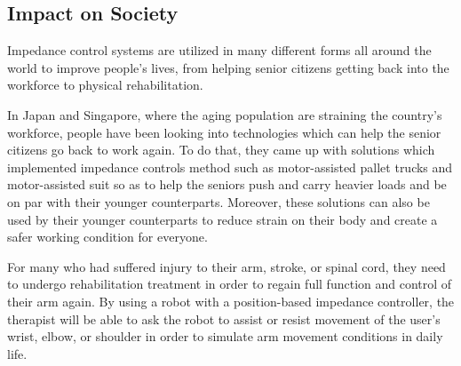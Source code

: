 \documentclass[twocolumn]{article}
\begin{document}
	
	
\subsection*{Impact on Society}
Impedance control systems are utilized in many different forms all around the world to improve people's lives, from helping senior citizens getting back into the workforce to physical rehabilitation.

In Japan and Singapore, where the aging population are straining the country's workforce, people have been looking into technologies which can help the senior citizens go back to work again. To do that, they came up with solutions which implemented impedance controls method such as motor-assisted pallet trucks and motor-assisted suit so as to help the seniors push and carry heavier loads and be on par with their younger counterparts. Moreover, these solutions can also be used by their younger counterparts to reduce strain on their body and create a safer working condition for everyone.

For many who had suffered injury to their arm, stroke, or spinal cord, they need to undergo rehabilitation treatment in order to regain full function and control of their arm again. By using a robot with a position-based impedance controller, the therapist will be able to ask the robot to assist or resist movement of the user's wrist, elbow, or shoulder in order to simulate arm movement conditions in daily life.

\end{document}
